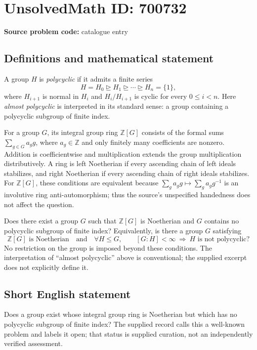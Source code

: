 \documentclass[11pt]{article}
\newcommand{\Z}{\mathbb{Z}}
\begin{document}
\section*{UnsolvedMath ID: 700732}
\textbf{Source problem code:} catalogue entry
\subsection{Definitions and mathematical statement}
A group \(H\) is \emph{polycyclic} if it admits a finite series
\[
H=H_0\trianglerighteq H_1\trianglerighteq\cdots\trianglerighteq H_n=\{1\},
\]
where \(H_{i+1}\) is normal in \(H_i\) and \(H_i/H_{i+1}\) is cyclic for every \(0\leq i<n\). Here \emph{almost polycyclic} is interpreted in its standard sense: a group containing a polycyclic subgroup of finite index.

For a group \(G\), its integral group ring \(\Z[G]\) consists of the formal sums \(\sum_{g\in G}a_g g\), where \(a_g\in\Z\) and only finitely many coefficients are nonzero. Addition is coefficientwise and multiplication extends the group multiplication distributively. A ring is left Noetherian if every ascending chain of left ideals stabilizes, and right Noetherian if every ascending chain of right ideals stabilizes. For \(\Z[G]\), these conditions are equivalent because \(\sum_g a_g g\mapsto\sum_g a_g g^{-1}\) is an involutive ring anti-automorphism; thus the source's unspecified handedness does not affect the question.

Does there exist a group \(G\) such that \(\Z[G]\) is Noetherian and \(G\) contains no polycyclic subgroup of finite index? Equivalently, is there a group \(G\) satisfying
\[
\Z[G]\text{ is Noetherian}
\quad\text{and}\quad
\forall H\leq G,\qquad [G:H]<\infty\ \Longrightarrow\ H\text{ is not polycyclic}?
\]
No restriction on the group is imposed beyond these conditions. The interpretation of ``almost polycyclic'' above is conventional; the supplied excerpt does not explicitly define it.
\subsection{Short English statement}
Does a group exist whose integral group ring is Noetherian but which has no polycyclic subgroup of finite index? The supplied record calls this a well-known problem and labels it open; that status is supplied curation, not an independently verified assessment.
\end{document}
